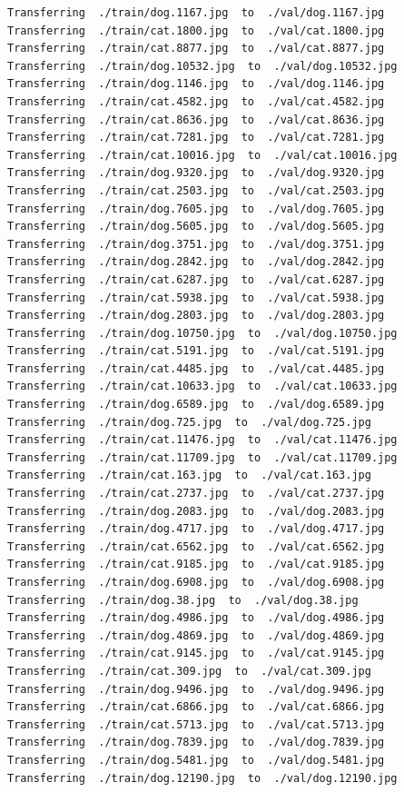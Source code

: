 \documentclass[]{book}
\theoremstyle{definition}
\theoremstyle{definition}
\theoremstyle{definition}
\theoremstyle{remark}
\begin{document}
\begin{verbatim}
Transferring  ./train/dog.1167.jpg  to  ./val/dog.1167.jpg
Transferring  ./train/cat.1800.jpg  to  ./val/cat.1800.jpg
Transferring  ./train/cat.8877.jpg  to  ./val/cat.8877.jpg
Transferring  ./train/dog.10532.jpg  to  ./val/dog.10532.jpg
Transferring  ./train/dog.1146.jpg  to  ./val/dog.1146.jpg
Transferring  ./train/cat.4582.jpg  to  ./val/cat.4582.jpg
Transferring  ./train/cat.8636.jpg  to  ./val/cat.8636.jpg
Transferring  ./train/cat.7281.jpg  to  ./val/cat.7281.jpg
Transferring  ./train/cat.10016.jpg  to  ./val/cat.10016.jpg
Transferring  ./train/dog.9320.jpg  to  ./val/dog.9320.jpg
Transferring  ./train/cat.2503.jpg  to  ./val/cat.2503.jpg
Transferring  ./train/dog.7605.jpg  to  ./val/dog.7605.jpg
Transferring  ./train/dog.5605.jpg  to  ./val/dog.5605.jpg
Transferring  ./train/dog.3751.jpg  to  ./val/dog.3751.jpg
Transferring  ./train/dog.2842.jpg  to  ./val/dog.2842.jpg
Transferring  ./train/cat.6287.jpg  to  ./val/cat.6287.jpg
Transferring  ./train/cat.5938.jpg  to  ./val/cat.5938.jpg
Transferring  ./train/dog.2803.jpg  to  ./val/dog.2803.jpg
Transferring  ./train/dog.10750.jpg  to  ./val/dog.10750.jpg
Transferring  ./train/cat.5191.jpg  to  ./val/cat.5191.jpg
Transferring  ./train/cat.4485.jpg  to  ./val/cat.4485.jpg
Transferring  ./train/cat.10633.jpg  to  ./val/cat.10633.jpg
Transferring  ./train/dog.6589.jpg  to  ./val/dog.6589.jpg
Transferring  ./train/dog.725.jpg  to  ./val/dog.725.jpg
Transferring  ./train/cat.11476.jpg  to  ./val/cat.11476.jpg
Transferring  ./train/cat.11709.jpg  to  ./val/cat.11709.jpg
Transferring  ./train/cat.163.jpg  to  ./val/cat.163.jpg
Transferring  ./train/cat.2737.jpg  to  ./val/cat.2737.jpg
Transferring  ./train/dog.2083.jpg  to  ./val/dog.2083.jpg
Transferring  ./train/dog.4717.jpg  to  ./val/dog.4717.jpg
Transferring  ./train/cat.6562.jpg  to  ./val/cat.6562.jpg
Transferring  ./train/cat.9185.jpg  to  ./val/cat.9185.jpg
Transferring  ./train/dog.6908.jpg  to  ./val/dog.6908.jpg
Transferring  ./train/dog.38.jpg  to  ./val/dog.38.jpg
Transferring  ./train/dog.4986.jpg  to  ./val/dog.4986.jpg
Transferring  ./train/dog.4869.jpg  to  ./val/dog.4869.jpg
Transferring  ./train/cat.9145.jpg  to  ./val/cat.9145.jpg
Transferring  ./train/cat.309.jpg  to  ./val/cat.309.jpg
Transferring  ./train/dog.9496.jpg  to  ./val/dog.9496.jpg
Transferring  ./train/cat.6866.jpg  to  ./val/cat.6866.jpg
Transferring  ./train/cat.5713.jpg  to  ./val/cat.5713.jpg
Transferring  ./train/dog.7839.jpg  to  ./val/dog.7839.jpg
Transferring  ./train/dog.5481.jpg  to  ./val/dog.5481.jpg
Transferring  ./train/dog.12190.jpg  to  ./val/dog.12190.jpg

\end{verbatim}
\end{document}
